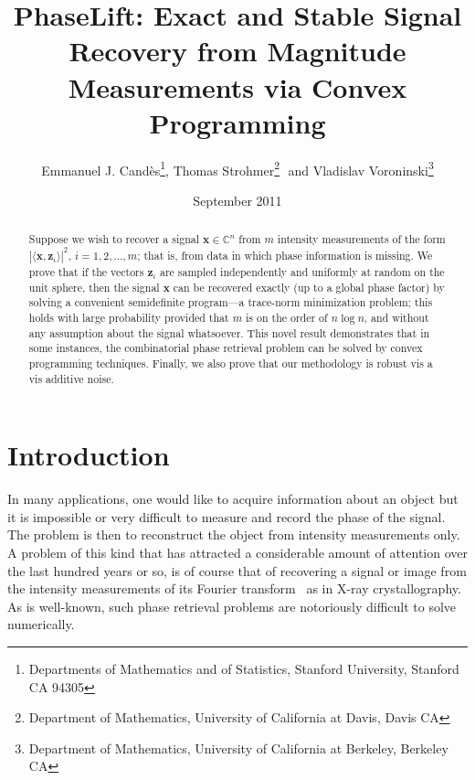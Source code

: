 \documentclass[11pt]{article}
\author{Emmanuel J. Cand\`{e}s\thanks{Departments of Mathematics and
    of Statistics, Stanford University, Stanford CA 94305}, Thomas
  Strohmer\thanks{Department of Mathematics, University of California
    at Davis, Davis CA}\,\, and Vladislav Voroninski\thanks{Department
    of Mathematics, University of California at Berkeley, Berkeley
    CA}}
\title{PhaseLift: Exact and Stable Signal Recovery from Magnitude
  Measurements via Convex Programming}
\date{September 2011}
\newcommand{\C}{\mathbb{C}}
\newcommand{\<}{\langle}
\renewcommand{\>}{\rangle}
\newcommand{\bx}{\bm{x}}
\newcommand{\bz}{\bm{z}}
\numberwithin{equation}{section}
\begin{document}
\maketitle

\begin{abstract}
  Suppose we wish to recover a signal $\bx \in \C^n$ from $m$
  intensity measurements of the form $|\langle \bx,\bz_i \rangle|^2$,
  $i = 1, 2, \ldots, m$; that is, from data in which phase information
  is missing. We prove that if the vectors $\bz_i$ are sampled
  independently and uniformly at random on the unit sphere, then the
  signal $\bx$ can be recovered exactly (up to a global phase factor)
  by solving a convenient semidefinite program---a trace-norm
  minimization problem; this holds with large probability provided
  that $m$ is on the order of $n \log n$, and without any assumption
  about the signal whatsoever. This novel result demonstrates that in
  some instances, the combinatorial phase retrieval problem can be
  solved by convex programming techniques. Finally, we also prove 
  that our methodology is robust vis a vis additive noise.
\end{abstract}

\section{Introduction}
\label{sec:intro}


In many applications, one would like to acquire information about an
object but it is impossible or very difficult to measure and record
the phase of the signal. The problem is then to reconstruct the object 
from intensity measurements only. A problem of this kind that has
attracted a considerable amount of attention over the last hundred
years or so, is of course that of recovering a signal or image from the
intensity measurements of its Fourier transform~\cite{Hur89,KST95} as
in X-ray crystallography. As is well-known, such phase retrieval
problems are notoriously difficult to solve numerically.

\end{document}
